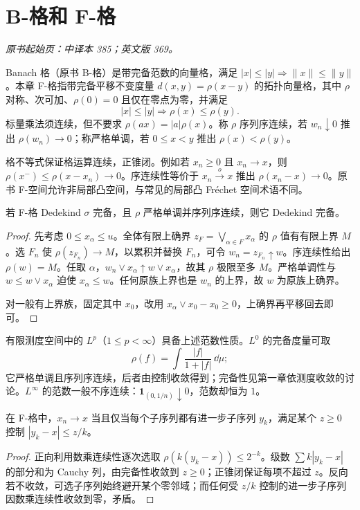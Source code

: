 \section{B-格和 F-格}\label{sec:yosida-12-03}
\noindent\textit{原书起始页：中译本 385；英文版 369。}

\begin{definition}[拓扑格与序连续性]
Banach 格（原书 B-格）是带完备范数的向量格，满足 $|x|\le|y|\Rightarrow\|x\|\le\|y\|$。本章 F-格指带完备平移不变度量 $d(x,y)=\rho(x-y)$ 的拓扑向量格，其中 $\rho$ 对称、次可加、$\rho(0)=0$ 且仅在零点为零，并满足
\[
 |x|\le|y|\Longrightarrow\rho(x)\le\rho(y).
\]
标量乘法须连续，但不要求 $\rho(ax)=|a|\rho(x)$。称 $\rho$ 序列序连续，若 $w_n\downarrow0$ 推出 $\rho(w_n)\to0$；称严格单调，若 $0\le x<y$ 推出 $\rho(x)<\rho(y)$。
\end{definition}

格不等式保证格运算连续，正锥闭。例如若 $x_n\ge0$ 且 $x_n\to x$，则 $\rho(x^-)\le\rho(x-x_n)\to0$。序连续性等价于 $x_n\xrightarrow{o}x$ 推出 $\rho(x_n-x)\to0$。原书 F-空间允许非局部凸空间，与常见的局部凸 Fr\'echet 空间术语不同。

\begin{theorem}[从可数完备到完全完备]\label{thm:y12-dedekind-complete}
若 F-格 Dedekind $\sigma$ 完备，且 $\rho$ 严格单调并序列序连续，则它 Dedekind 完备。
\end{theorem}
\begin{proof}
先考虑 $0\le x_\alpha\le u$。全体有限上确界 $z_F=\bigvee_{\alpha\in F}x_\alpha$ 的 $\rho$ 值有有限上界 $M$。选 $F_n$ 使 $\rho(z_{F_n})\to M$，以累积并替换 $F_n$，可令 $w_n=z_{F_n}\uparrow w$。序连续性给出 $\rho(w)=M$。任取 $\alpha$，$w_n\vee x_\alpha\uparrow w\vee x_\alpha$，故其 $\rho$ 极限至多 $M$。严格单调性与 $w\le w\vee x_\alpha$ 迫使 $x_\alpha\le w$。任何原族上界也是 $w_n$ 的上界，故 $w$ 为原族上确界。

对一般有上界族，固定其中 $x_0$，改用 $x_\alpha\vee x_0-x_0\ge0$，上确界再平移回去即可。
\end{proof}

\begin{example}[函数格]
有限测度空间中的 $L^p$（$1\le p<\infty$）具备上述范数性质。$L^0$ 的完备度量可取
\[
 \rho(f)=\int\frac{|f|}{1+|f|}\,\dd\mu;
\]
它严格单调且序列序连续，后者由控制收敛得到；完备性见第一章依测度收敛的讨论。$L^\infty$ 的范数一般不序连续：$\mathbf1_{(0,1/n)}\downarrow0$，范数却恒为 $1$。
\end{example}

\begin{proposition}[相对一致子序列判别]\label{prop:y12-relative-uniform}
在 F-格中，$x_n\to x$ 当且仅当每个子序列都有进一步子序列 $y_k$，满足某个 $z\ge0$ 控制 $|y_k-x|\le z/k$。
\end{proposition}
\begin{proof}
正向利用数乘连续性逐次选取 $\rho(k(y_k-x))\le2^{-k}$。级数 $\sum k|y_k-x|$ 的部分和为 Cauchy 列，由完备性收敛到 $z\ge0$；正锥闭保证每项不超过 $z$。反向若不收敛，可选子序列始终避开某个零邻域；而任何受 $z/k$ 控制的进一步子序列因数乘连续性收敛到零，矛盾。
\end{proof}

